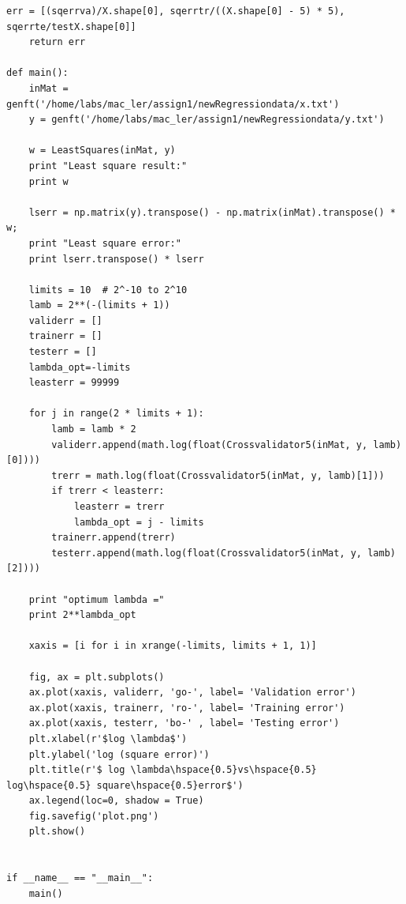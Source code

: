 \documentclass[a4paper,11pt]{article}
\theoremstyle{mytheor}
\begin{document}
\begin{lstlisting}[label={list:second},caption=Regression.]
    err = [(sqerrva)/X.shape[0], sqerrtr/((X.shape[0] - 5) * 5), sqerrte/testX.shape[0]]
    return err

def main():
    inMat = genft('/home/labs/mac_ler/assign1/newRegressiondata/x.txt')
    y = genft('/home/labs/mac_ler/assign1/newRegressiondata/y.txt')
    
    w = LeastSquares(inMat, y)
    print "Least square result:"
    print w
    
    lserr = np.matrix(y).transpose() - np.matrix(inMat).transpose() * w;
    print "Least square error:"
    print lserr.transpose() * lserr
    
    limits = 10  # 2^-10 to 2^10
    lamb = 2**(-(limits + 1))
    validerr = []
    trainerr = []
    testerr = []
    lambda_opt=-limits
    leasterr = 99999
    
    for j in range(2 * limits + 1):
        lamb = lamb * 2
        validerr.append(math.log(float(Crossvalidator5(inMat, y, lamb)[0])))
        trerr = math.log(float(Crossvalidator5(inMat, y, lamb)[1]))
        if trerr < leasterr:
            leasterr = trerr
            lambda_opt = j - limits
        trainerr.append(trerr)
        testerr.append(math.log(float(Crossvalidator5(inMat, y, lamb)[2])))
    
    print "optimum lambda ="
    print 2**lambda_opt
    
    xaxis = [i for i in xrange(-limits, limits + 1, 1)]
    
    fig, ax = plt.subplots()
    ax.plot(xaxis, validerr, 'go-', label= 'Validation error')
    ax.plot(xaxis, trainerr, 'ro-', label= 'Training error')
    ax.plot(xaxis, testerr, 'bo-' , label= 'Testing error')
    plt.xlabel(r'$log \lambda$')
    plt.ylabel('log (square error)')
    plt.title(r'$ log \lambda\hspace{0.5}vs\hspace{0.5} log\hspace{0.5} square\hspace{0.5}error$')
    ax.legend(loc=0, shadow = True)
    fig.savefig('plot.png')
    plt.show()
    

if __name__ == "__main__":
    main()
\end{lstlisting}
\end{document}
